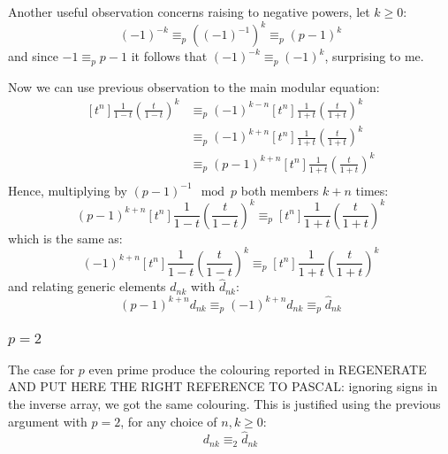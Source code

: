 \documentclass[10pt,a4paper]{article} %
\begin{document}
    Another useful observation concerns raising to negative powers,
    let $k \geq 0$:
    \begin{displaymath}
        (-1)^{-k} \equiv_{p} \left((-1)^{-1}\right)^{k} \equiv_{p} (p-1)^k
    \end{displaymath}
    and since $-1 \equiv_{p} p-1$ it follows that
    $(-1)^{-k} \equiv_{p} (-1)^k$, surprising to me.
    
    Now we can use previous observation to the main modular equation:
    \begin{displaymath}
        \begin{split}
            [t^n]\frac{1}{1-t}\left(\frac{t}{1-t}\right)^k 
                &\equiv_{p} (-1)^{k-n}[t^n]\frac{1}{1+t}\left(\frac{t}{1+t}\right)^k \\
                &\equiv_{p} (-1)^{k+n}[t^n]\frac{1}{1+t}\left(\frac{t}{1+t}\right)^k \\
                &\equiv_{p} (p-1)^{k+n}[t^n]\frac{1}{1+t}\left(\frac{t}{1+t}\right)^k \\
        \end{split}
    \end{displaymath}
    Hence, multiplying by $(p-1)^{-1}\mod p$ both members $k+n$ times:
    \begin{displaymath}
        (p-1)^{k+n}[t^n]\frac{1}{1-t}\left(\frac{t}{1-t}\right)^k \equiv_{p} [t^n]\frac{1}{1+t}\left(\frac{t}{1+t}\right)^k 
    \end{displaymath}
    which is the same as:
    \begin{displaymath}
        (-1)^{k+n}[t^n]\frac{1}{1-t}\left(\frac{t}{1-t}\right)^k \equiv_{p} [t^n]\frac{1}{1+t}\left(\frac{t}{1+t}\right)^k 
    \end{displaymath}
    and relating generic elements $d_{nk}$ with $\hat{d}_{nk}$:
    \begin{displaymath}
        (p-1)^{k+n}d_{nk}\equiv_{p}(-1)^{k+n}d_{nk} \equiv_{p} \hat{d}_{nk}
    \end{displaymath}

    \subsubsection{$p=2$}
    The case for $p$ even prime produce the colouring reported in
    REGENERATE AND PUT HERE THE RIGHT REFERENCE TO PASCAL: ignoring
    signs in the inverse array, we got the same colouring.  This is
    justified using the previous argument with $p=2$, for any choice
    of $n, k \geq 0$:
    \begin{displaymath} 
        d_{nk} \equiv_{2} \hat{d}_{nk} 
    \end{displaymath} 
\end{document}

